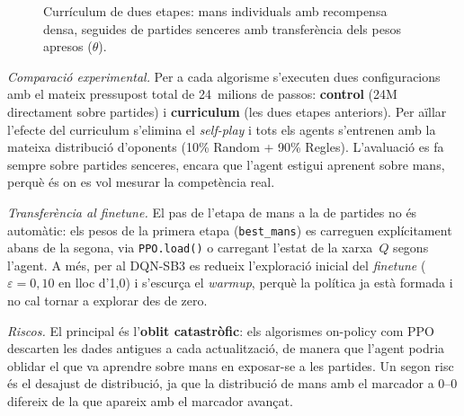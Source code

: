 \begin{figure}[H]
  \centering
  \caption{Currículum de dues etapes: mans individuals amb recompensa densa, seguides de
           partides senceres amb transferència dels pesos apresos ($\theta$).}
  \label{fig:fase2-curriculum}
\end{figure}

\emph{Comparació experimental.} Per a cada algorisme s'executen dues configuracions amb el
mateix pressupost total de 24~milions de passos: \textbf{control} (24M directament sobre
partides) i \textbf{curriculum} (les dues etapes anteriors). Per aïllar l'efecte del
curriculum s'elimina el \emph{self-play} i tots els agents s'entrenen amb la mateixa
distribució d'oponents (10\% Random + 90\% Regles). L'avaluació es fa sempre sobre partides
senceres, encara que l'agent estigui aprenent sobre mans, perquè és on es vol mesurar la
competència real.

\emph{Transferència al finetune.} El pas de l'etapa de mans a la de partides no és
automàtic: els pesos de la primera etapa (\texttt{best\_mans}) es carreguen explícitament
abans de la segona, via \texttt{PPO.load()} o carregant l'estat de la xarxa~$Q$ segons
l'agent. A més, per al DQN-SB3 es redueix l'exploració inicial del \emph{finetune}
($\varepsilon = 0{,}10$ en lloc d'1{,}0) i s'escurça el \emph{warmup}, perquè la política ja
està formada i no cal tornar a explorar des de zero.

\emph{Riscos.} El principal és l'\textbf{oblit catastròfic}: els algorismes on-policy com
PPO descarten les dades antigues a cada actualització, de manera que l'agent podria oblidar
el que va aprendre sobre mans en exposar-se a les partides. Un segon risc és el desajust de
distribució, ja que la distribució de mans amb el marcador a 0--0 difereix de la que
apareix amb el marcador avançat.

